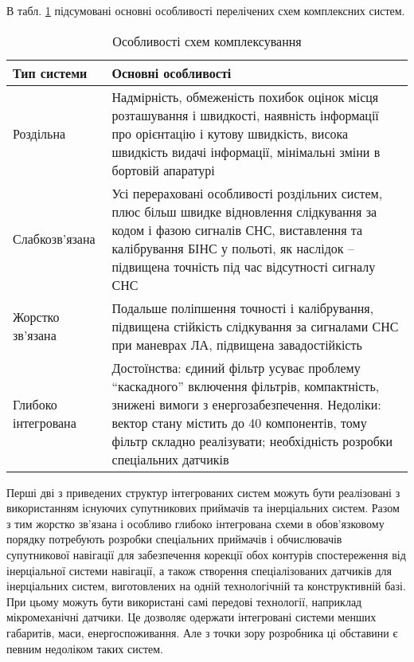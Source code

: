 В табл. \ref{tab:compare} підсумовані основні особливості перелічених схем комплексних систем.

\begin{table}[here]
\centering
\caption{Особливості схем комплексування}
\label{tab:compare}
\begin{tabular}{|p{30mm}|p{110mm}|} \hline 
Тип системи & Основні особливості \\ \hline 
Роздільна & Надмірність, обмеженість похибок оцінок місця розташування і швидкості, 
наявність інформації про орієнтацію і кутову швидкість, висока швидкість видачі інформації, 
мінімальні зміни в бортовій апаратурі  \\ \hline 

Слабко\newline зв'язана & Усі перераховані особливості роздільних систем, плюс більш 
швидке відновлення слідкування за кодом і фазою сигналів СНС, виставлення та калібрування 
БІНС у польоті, як наслідок -- підвищена точність під час відсутності сигналу СНС  \\ \hline 

Жорстко зв'язана & Подальше поліпшення точності і калібрування, підвищена стійкість слідкування 
за сигналами СНС при маневрах ЛА, підвищена завадостійкість  \\ \hline
 
Глибоко інтегрована & Достоїнства: єдиний фільтр усуває проблему ``каскадного'' включення 
фільтрів, компактність, знижені вимоги з енергозабезпечення. Недоліки: вектор стану 
містить до 40 компонентів, тому фільтр складно реалізувати; необхідність розробки 
спеціальних датчиків  \\ \hline 
\end{tabular}
\end{table}

Перші дві з приведених структур інтегрованих систем можуть бути реалізовані з використанням 
існуючих супутникових приймачів та інерціальних систем. Разом з тим жорстко зв'язана 
і особливо глибоко інтегрована схеми в обов'язковому порядку потребують розробки 
спеціальних приймачів і обчислювачів супутникової навігації для забезпечення корекції 
обох контурів спостереження від інерціальної системи навігації, а також створення 
спеціалізованих датчиків для інерціальних систем, виготовлених на одній технологічній 
та конструктивній базі. При цьому можуть бути використані самі передові технології, 
наприклад мікромеханічні датчики. Це дозволяє одержати інтегровані системи менших 
габаритів, маси, енергоспоживання. Але з точки зору розробника ці обставини є певним 
недоліком таких систем. 

